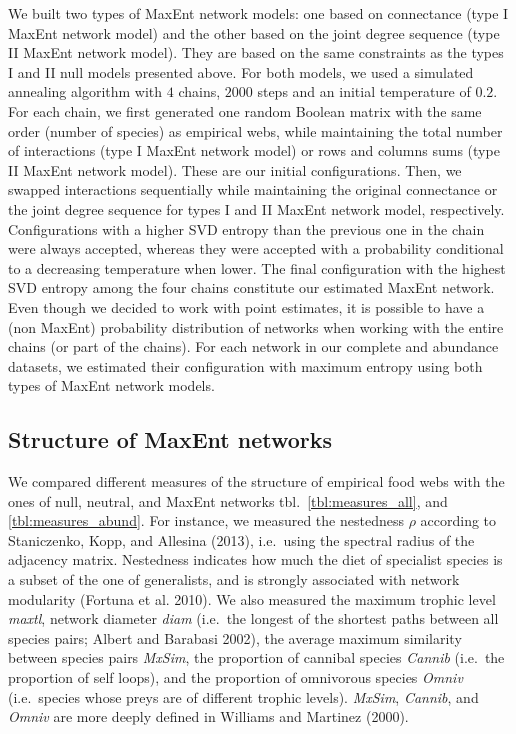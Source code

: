 \documentclass[10pt,oneside]{article}
\begin{document}
We built two types of MaxEnt network models: one based on connectance
(type I MaxEnt network model) and the other based on the joint degree
sequence (type II MaxEnt network model). They are based on the same
constraints as the types I and II null models presented above. For both
models, we used a simulated annealing algorithm with \(4\) chains,
\(2000\) steps and an initial temperature of \(0.2\). For each chain, we
first generated one random Boolean matrix with the same order (number of
species) as empirical webs, while maintaining the total number of
interactions (type I MaxEnt network model) or rows and columns sums
(type II MaxEnt network model). These are our initial configurations.
Then, we swapped interactions sequentially while maintaining the
original connectance or the joint degree sequence for types I and II
MaxEnt network model, respectively. Configurations with a higher SVD
entropy than the previous one in the chain were always accepted, whereas
they were accepted with a probability conditional to a decreasing
temperature when lower. The final configuration with the highest SVD
entropy among the four chains constitute our estimated MaxEnt network.
Even though we decided to work with point estimates, it is possible to
have a (non MaxEnt) probability distribution of networks when working
with the entire chains (or part of the chains). For each network in our
complete and abundance datasets, we estimated their configuration with
maximum entropy using both types of MaxEnt network models.

\hypertarget{structure-of-maxent-networks}{%
\subsection{Structure of MaxEnt
networks}\label{structure-of-maxent-networks}}

We compared different measures of the structure of empirical food webs
with the ones of null, neutral, and MaxEnt networks
tbl.~\ref{tbl:measures_all}, and \ref{tbl:measures_abund}. For instance,
we measured the nestedness \(\rho\) according to Staniczenko, Kopp, and
Allesina (2013), i.e.~using the spectral radius of the adjacency matrix.
Nestedness indicates how much the diet of specialist species is a subset
of the one of generalists, and is strongly associated with network
modularity (Fortuna et al. 2010). We also measured the maximum trophic
level \emph{maxtl}, network diameter \emph{diam} (i.e.~the longest of
the shortest paths between all species pairs; Albert and Barabasi 2002),
the average maximum similarity between species pairs \emph{MxSim}, the
proportion of cannibal species \emph{Cannib} (i.e.~the proportion of
self loops), and the proportion of omnivorous species \emph{Omniv}
(i.e.~species whose preys are of different trophic levels).
\emph{MxSim}, \emph{Cannib}, and \emph{Omniv} are more deeply defined in
Williams and Martinez (2000).
\end{document}
